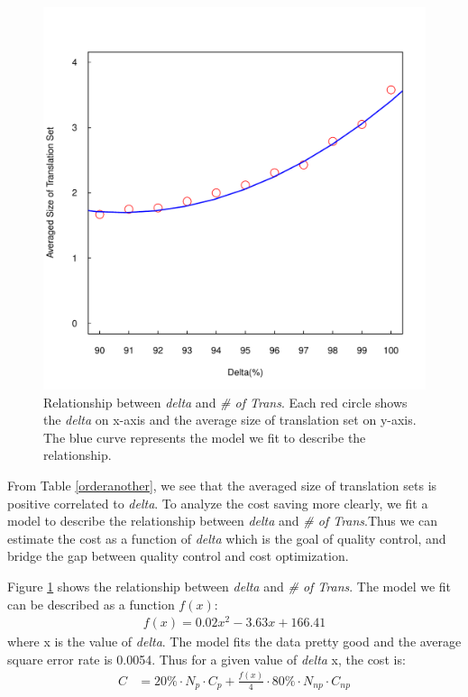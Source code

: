 \documentclass[11pt]{article}
\begin{document}
\begin{figure}[h!]
  \centering
  \includegraphics[width=\linewidth]{fitsizedelta/fit.pdf}
  \caption{Relationship between \textit{delta} and \textit{\# of Trans}. Each red circle shows the \textit{delta} on x-axis and the average size of translation set on y-axis. The blue curve represents the model we fit to describe the relationship.}
    \label{fit}
\end{figure}

From Table \ref{orderanother}, we see that the averaged size of translation sets is positive correlated to \textit{delta}. To analyze the cost saving more clearly, we fit a model to describe the relationship between \textit{delta} and \textit{\# of Trans}.Thus we can estimate the cost as a function of \textit{delta} which is the goal of  quality control, and bridge the gap between quality control and cost optimization.

Figure \ref{fit} shows the relationship between \textit{delta} and \textit{\# of Trans}. The model we fit can be described as a function $f(x)$:
\begin{align*}
f(x) = 0.02x^2 - 3.63x+166.41
\end{align*}
 where x is the value of \textit{delta}. The model fits the data pretty good and the average square error rate is 
0.0054. Thus for a given value of \textit{delta} x, the cost is:
\begin{align*}
C& = 20\% \cdot N_{p}\cdot C_{p}  +  \frac{f(x)}{4}\cdot 80\% \cdot N_{np} \cdot C_{np}\\
\end{align*} 
\end{document}
